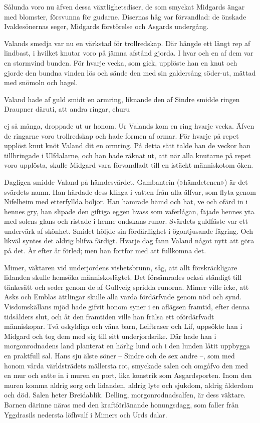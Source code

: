 Sålunda voro nu äfven dessa växtlighetsdiser, de som smyckat Midgards
ängar med blomster, försvunna för gudarne. Disernas håg var förvandlad:
de önskade Ivaldesönernas seger, Midgards förstörelse och Asgards
undergång.

Valands smedja var nu en värkstad för trollredskap. Där hängde ett långt
rep af lindbast, i hvilket knutar voro på jämna afstånd gjorda. I hvar
och en af dem var en stormvind bunden. För hvarje vecka, som gick,
upplöste han en knut och gjorde den bundna vinden lös och sände den med
sin galdersång söder-ut, mättad med snömoln och hagel.

Valand hade af guld smidt en armring, liknande den af Sindre smidde
ringen Draupner däruti, att andra ringar, ehuru

ej så många, droppade ut ur honom. Ur Valands kom en ring hvarje vecka.
Äfven de ringarne voro trollredskap och hade formen af ormar. För hvarje
på repet upplöst knut knöt Valand dit en ormring. På detta sätt talde
han de veckor han tillbringade i Ulfdalarne, och han hade räknat ut, att
när alla knutarne på repet voro upplösta, skulle Midgard vara
förvandladt till en istäckt människotom öken.

Dagligen smidde Valand på hämdesvärdet. Gambantein (»hämdetenen») är det
svärdets namn. Han härdade dess klinga i vatten från alla älfvar, som
flyta genom Nifelheim med etterfyllda böljor. Han hamrade hämd och hat,
ve och ofärd in i hennes gry, han slipade den giftiga eggen hvass som
vaferlågan, fäjade hennes yta med solens glans och ristade i henne
ondskans runor. Svärdets guldfäste var ett undervärk af skönhet. Smidet
höljde sin fördärflighet i ögontjusande fägring. Och likväl syntes det
aldrig blifva färdigt. Hvarje dag fann Valand något nytt att göra på
det. År efter år förled; men han fortfor med att fullkomna det.

Mimer, väktaren vid underjordens vishetsbrunn, såg, att allt
förskräckligare lidanden skulle hemsöka människoslägtet. Det försämrades
också ständigt till tänkesätt och seder genom de af Gullveig spridda
runorna. Mimer ville icke, att Asks och Emblas ättlingar skulle alla
varda fördärfvade genom nöd och synd. Visdomskällans mjöd hade gifvit
honom syner i en aflägsen framtid, efter denna tidsålders slut, och åt
den framtiden ville han frälsa ett ofördärfvadt människopar. Två
oskyldiga och väna barn, Leiftraser och Lif, uppsökte han i Midgard och
tog dem med sig till sitt underjordsrike. Där hade han i morgonrodnadens
land planterat en härlig lund och i den lunden låtit uppbygga en
praktfull sal. Hans sju älste söner -- Sindre och de sex andre --, som
med honom vårda världsträdets mällersta rot, smyckade salen och omgåfvo
den med en mur och satte in i muren en port, lika konstrik som
Asgardsporten. Inom den muren komma aldrig sorg och lidanden, aldrig
lyte och sjukdom, aldrig ålderdom och död. Salen heter Breidablik.
Delling,
morgonrodnadsalfen,
är dess väktare. Barnen därinne näras med den kraftförlänande
honungsdagg, som faller från Yggdrasils nedersta löfhvalf i Mimers och
Urds dalar.

